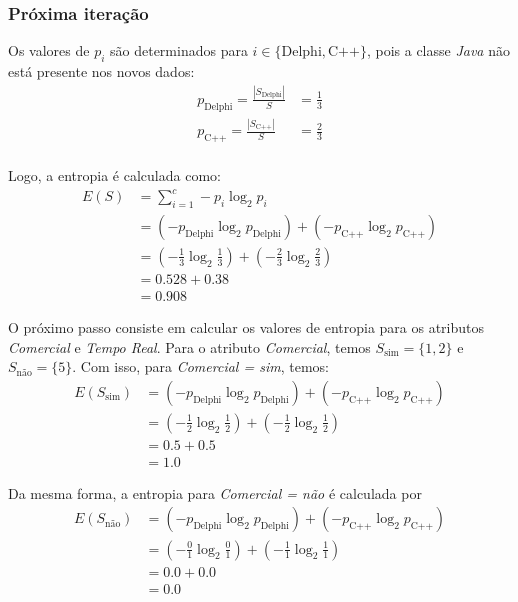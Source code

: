 \subsubsection{Próxima iteração}

Os valores de $p_i$ são determinados para $i \in \{\text{Delphi}, \text{C++}\}$, pois a classe \textit{Java} não está presente nos novos dados:
\begin{align*}
	p_{\text{Delphi}} = \frac{|S_{\text{Delphi}}|}{S} &= \frac{1}{3} \\[10pt]
	p_{\text{C++}} = \frac{|S_{\text{C++}}|}{S} &= \frac{2}{3} \\[10pt]
\end{align*}

Logo, a entropia é calculada como:
\begin{align*}
	E(S) &= \sum_{i=1}^{c} -p_i \log_2 p_i \\[10pt]
	&= (-p_{\text{Delphi}} \log_2 p_{\text{Delphi}}) + (-p_{\text{C++}} \log_2 p_{\text{C++}}) \\[10pt]
	&= \left( -\frac{1}{3} \log_2 \frac{1}{3} \right) + \left( -\frac{2}{3} \log_2 \frac{2}{3} \right) \\[10pt]
	&= 0.528 + 0.38\\[10pt]
	&= 0.908
\end{align*}

O próximo passo consiste em calcular os valores de entropia para os atributos \textit{Comercial} e \textit{Tempo Real}. Para o atributo \textit{Comercial}, temos $S_\text{sim} = \{1, 2\}$ e $S_\text{não} = \{5\}$. Com isso, para \textit{Comercial = sim}, temos:
\begin{align*}
	E(S_\text{sim}) &= (-p_\text{Delphi} \log_2 p_\text{Delphi}) + (-p_\text{C++} \log_2 p_\text{C++})\\[10pt]
	&= \left( - \frac{1}{2} \log_2 \frac{1}{2} \right) + \left( - \frac{1}{2} \log_2 \frac{1}{2} \right)\\[10pt]
	&= 0.5 + 0.5\\[10pt]
	&= 1.0
\end{align*}

Da mesma forma, a entropia para \textit{Comercial = não} é calculada por 
\begin{align*}
	E(S_\text{não}) &= (-p_\text{Delphi} \log_2 p_\text{Delphi}) + (-p_\text{C++} \log_2 p_\text{C++})\\[10pt]
	&= \left( - \frac{0}{1} \log_2 \frac{0}{1} \right) + \left( - \frac{1}{1} \log_2 \frac{1}{1} \right)\\[10pt]
	&= 0.0 + 0.0\\[10pt]
	&= 0.0
\end{align*}

